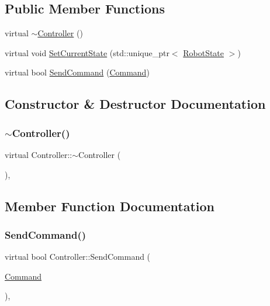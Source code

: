 \subsection*{Public Member Functions}
\begin{DoxyCompactItemize}
\item 
virtual \mbox{\hyperlink{class_controller_a867c1b386aa6e63d986a01ddaeccea5a}{$\sim$\+Controller}} ()
\item 
virtual void \mbox{\hyperlink{class_controller_a8cb970ef732138c921434796ad66a75c}{Set\+Current\+State}} (std\+::unique\+\_\+ptr$<$ \mbox{\hyperlink{class_robot_state}{Robot\+State}} $>$)
\item 
virtual bool \mbox{\hyperlink{class_controller_a61906c4d57c4807205aac20ce6e34ea3}{Send\+Command}} (\mbox{\hyperlink{_commands_8h_a16664d91c016c57e51eff6cbd28e32cf}{Command}})
\end{DoxyCompactItemize}


\subsection{Constructor \& Destructor Documentation}
\mbox{\label{class_controller_a867c1b386aa6e63d986a01ddaeccea5a}} 
\subsubsection{\texorpdfstring{$\sim$Controller()}{~Controller()}}
{\footnotesize\ttfamily virtual Controller\+::$\sim$\+Controller (\begin{DoxyParamCaption}{ }\end{DoxyParamCaption})\hspace{0.3cm}{\ttfamily [inline]}, {\ttfamily [virtual]}}



\subsection{Member Function Documentation}
\mbox{\label{class_controller_a61906c4d57c4807205aac20ce6e34ea3}} 
\subsubsection{\texorpdfstring{SendCommand()}{SendCommand()}}
{\footnotesize\ttfamily virtual bool Controller\+::\+Send\+Command (\begin{DoxyParamCaption}\item[{\mbox{\hyperlink{_commands_8h_a16664d91c016c57e51eff6cbd28e32cf}{Command}}}]{ }\end{DoxyParamCaption})\hspace{0.3cm}{\ttfamily [inline]}, {\ttfamily [virtual]}}



